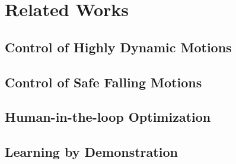 \chapter{Related Works}

\section{Control of Highly Dynamic Motions}

\section{Control of Safe Falling Motions}

\section{Human-in-the-loop Optimization}

\section{Learning by Demonstration}


